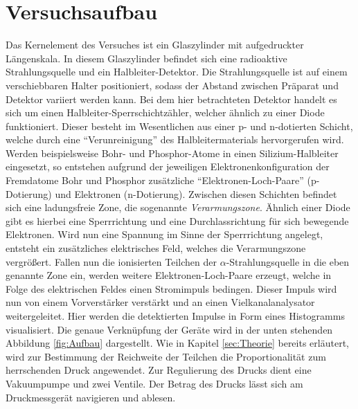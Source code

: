 %

%
\section{Versuchsaufbau}
\label{sec:Versuchsaufbau}

Das Kernelement des Versuches ist ein Glaszylinder mit aufgedruckter Längenskala. In diesem Glaszylinder befindet 
sich eine radioaktive Strahlungsquelle und ein Halbleiter-Detektor. Die Strahlungsquelle ist auf einem verschiebbaren Halter 
positioniert, sodass der Abstand zwischen Präparat und Detektor variiert werden kann. Bei dem hier betrachteten Detektor 
handelt es sich um einen Halbleiter-Sperrschichtzähler, welcher ähnlich zu einer Diode funktioniert. Dieser besteht im 
Wesentlichen aus einer p- und n-dotierten Schicht, welche durch eine \enquote{Verunreinigung} des Halbleitermaterials 
hervorgerufen wird. Werden beispielsweise Bohr- und Phosphor-Atome in einen Silizium-Halbleiter eingesetzt, so entstehen aufgrund 
der jeweiligen Elektronenkonfiguration der Fremdatome Bohr und Phosphor zusätzliche \enquote{Elektronen-Loch-Paare} (p-Dotierung)
und Elektronen (n-Dotierung). Zwischen diesen Schichten befindet sich eine ladungsfreie Zone, die sogenannte 
\emph{Verarmungszone}. Ähnlich einer Diode gibt es hierbei eine Sperrrichtung und eine Durchlassrichtung für sich bewegende Elektronen.
Wird nun eine Spannung im Sinne der Sperrrichtung angelegt, entsteht ein zusätzliches elektrisches Feld, welches die Verarmungszone 
vergrößert. Fallen nun die ionisierten Teilchen der $\alpha$-Strahlungsquelle in die eben genannte Zone ein, werden weitere
Elektronen-Loch-Paare erzeugt, welche in Folge des elektrischen Feldes einen Stromimpuls bedingen. Dieser Impuls wird nun von 
einem Vorverstärker verstärkt und an einen Vielkanalanalysator weitergeleitet. Hier werden die detektierten Impulse in Form eines Histogramms visualisiert. 
Die genaue Verknüpfung der Geräte wird in der unten stehenden Abbildung \ref{fig:Aufbau} dargestellt. Wie in Kapitel \ref{sec:Theorie} bereits erläutert,
wird zur Bestimmung der Reichweite der Teilchen die Proportionalität zum herrschenden Druck angewendet. Zur Regulierung des Drucks dient eine Vakuumpumpe 
und zwei Ventile. Der Betrag des Drucks lässt sich am Druckmessgerät navigieren und ablesen.

